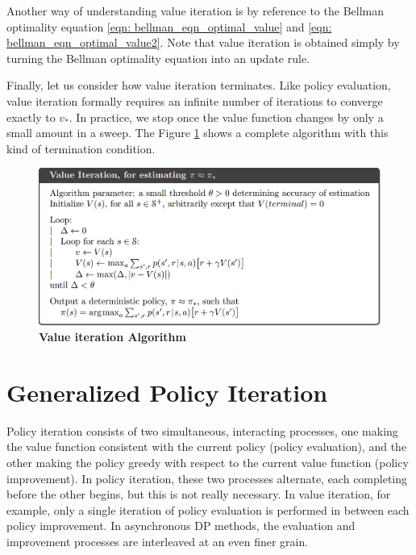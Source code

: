 \documentclass[11pt]{article}
\begin{document}
Another way of understanding value iteration is by reference to the Bellman optimality equation \eqref{eqn: bellman_eqn_optimal_value} and \eqref{eqn: bellman_eqn_optimal_value2}. Note that value iteration is obtained simply by turning the Bellman optimality equation into an update rule. 

Finally, let us consider how value iteration terminates. Like policy evaluation, value iteration formally requires an infinite number of iterations to converge exactly to $v_{*}$. In
practice, we stop once the value function changes by only a small amount in a sweep. The Figure \ref{fig: value_iter_algo} shows a complete algorithm with this kind of termination condition.
\begin{figure}
\begin{minipage}[t]{1\linewidth}
  \centering
  \centerline{\includegraphics[scale = 0.3]{value_iter_algo.png}}
\end{minipage}
\caption{\footnotesize{\textbf{Value iteration Algorithm}}}
\label{fig: value_iter_algo}
\end{figure}


\section{Generalized Policy Iteration}
Policy iteration consists of two simultaneous, interacting processes, one making the value function consistent with the current policy (policy evaluation), and the other making
the policy greedy with respect to the current value function (policy improvement). In policy iteration, these two processes alternate, each completing before the other begins,
but this is not really necessary. In value iteration, for example, only a single iteration of policy evaluation is performed in between each policy improvement. In asynchronous DP
methods, the evaluation and improvement processes are interleaved at an even finer grain.
\end{document}
